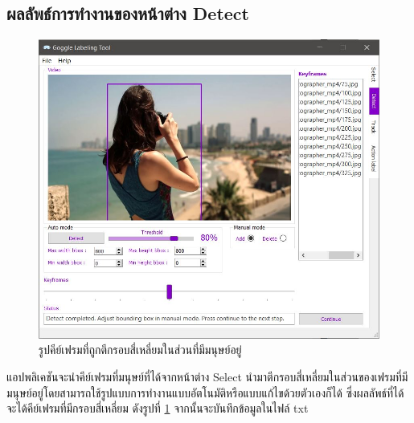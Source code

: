 \subsection*{ผลลัพธ์การทำงานของหน้าต่าง Detect}
\begin{figure}[!ht]
  \centering
    \includegraphics[scale=0.60]{chapter4/images/Result/result_select4.jpg}
    \caption{รูปคีย์เฟรมที่ถูกตีกรอบสี่เหลี่ยมในส่วนที่มีมนุษย์อยู่}
    \label{fig:result_detect}
\end{figure}
\clearpage
แอปพลิเคชันจะนำคีย์เฟรมที่มนุษย์ที่ได้จากหน้าต่าง Select นำมาตีกรอบสี่เหลี่ยมในส่วนของเฟรมที่มีมนุษย์อยู่โดยสามารถใช้รูปแบบการทำงานแบบอัตโนมัติหรือแบบแก้ไขด้วยตัวเองก็ได้ 
ซึ่งผลลัพธ์ที่ได้จะได้คีย์เฟรมที่มีกรอบสี่เหลี่ยม ดังรูปที่ \ref{fig:result_detect} จากนั้นจะบันทึกข้อมูลในไฟล์ txt 


